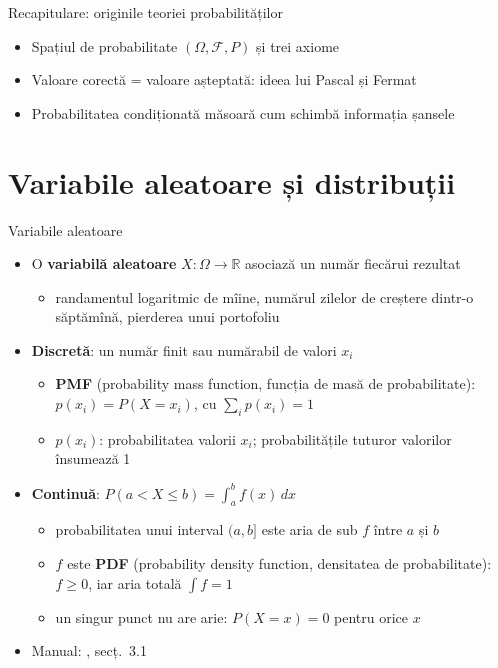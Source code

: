 \begin{frame}{Recapitulare: originile teoriei probabilităților}
\itemsize{\small}
\begin{itemize}
    \item Spațiul de probabilitate $(\Omega, \mathcal{F}, P)$ și trei axiome
    \item Valoare corectă = valoare așteptată: ideea lui Pascal și Fermat
    \item Probabilitatea condiționată măsoară cum schimbă informația șansele
\end{itemize}
\end{frame}


\section{Variabile aleatoare și distribuții}

\begin{frame}{Variabile aleatoare}
\itemsize{\footnotesize}
\begin{itemize}
    \item O \textbf{variabilă aleatoare} $X: \Omega \to \mathbb{R}$ asociază un număr fiecărui rezultat
    \begin{itemize}
        \item randamentul logaritmic de mîine, numărul zilelor de creștere dintr-o săptămînă, pierderea unui portofoliu
    \end{itemize}
    \item \textbf{Discretă}: un număr finit sau numărabil de valori $x_i$
    \begin{itemize}
        \item \textbf{PMF} (probability mass function, funcția de masă de probabilitate): $p(x_i) = P(X = x_i)$, cu $\sum_i p(x_i) = 1$
        \item $p(x_i)$: probabilitatea valorii $x_i$; probabilitățile tuturor valorilor însumează 1
    \end{itemize}
    \item \textbf{Continuă}: $P(a < X \le b) = \int_a^b f(x)\,dx$
    \begin{itemize}
        \item probabilitatea unui interval $(a, b]$ este aria de sub $f$ între $a$ și $b$
        \item $f$ este \textbf{PDF} (probability density function, densitatea de probabilitate): $f \ge 0$, iar aria totală $\int f = 1$
        \item un singur punct nu are arie: $P(X = x) = 0$ pentru orice $x$
    \end{itemize}
    \item Manual: , secț.~3.1
\end{itemize}
\end{frame}

